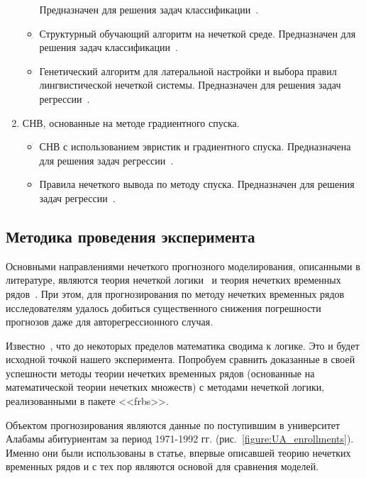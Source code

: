 \begin{enumerate}
\begin{itemize}
	 Предназначен для решения задач классификации~\cite{Ishibuchi2005}.
	\item Структурный обучающий алгоритм на нечеткой среде.  
	Предназначен для решения задач классификации~\cite{Gonzalez2001}. 
	\item Генетический алгоритм для латеральной настройки и выбора правил лингвистической нечеткой системы. 
	Предназначен для решения задач регрессии~\cite{Alcala2007}.
\end{itemize}
\item СНВ, основанные на методе градиентного спуска.
\begin{itemize}
	\item СНВ с использованием эвристик и градиентного спуска. Предназначена для решения задач регрессии~\cite{Ishibuchi1994}.
	\item Правила нечеткого вывода по методу спуска. 
	Предназначен для решения задач регрессии~\cite{Nomura1992}. 
\end{itemize}
\end{enumerate}

\subsection{Методика проведения эксперимента}

Основными направлениями нечеткого прогнозного моделирования, описанными в
литературе, являются теория нечеткой логики~\cite{Zadeh1973} и теория нечетких
временных рядов~\cite{Song1993}.  При этом, для прогнозирования по методу
нечетких временных рядов исследователям удалось добиться существенного снижения
погрешности прогнозов даже для авторегрессионного случая. 

Известно~\cite{sep-principia-mathematica}, что до некоторых пределов математика
сводима к логике. Это и будет исходной точкой нашего эксперимента. Попробуем
сравнить доказанные в своей успешности методы теории нечетких временных рядов
(основанные на математической теории нечетких множеств) с методами нечеткой
логики, реализованными в пакете <<frbs>>.  

Объектом прогнозирования являются данные по поступившим в университет Алабамы абитуриентам за период 1971-1992 гг. (рис.~\ref{figure:UA_enrollments}). Именно они были использованы в статье, впервые описавшей теорию нечетких временных рядов и с тех пор являются основой для сравнения моделей.  

